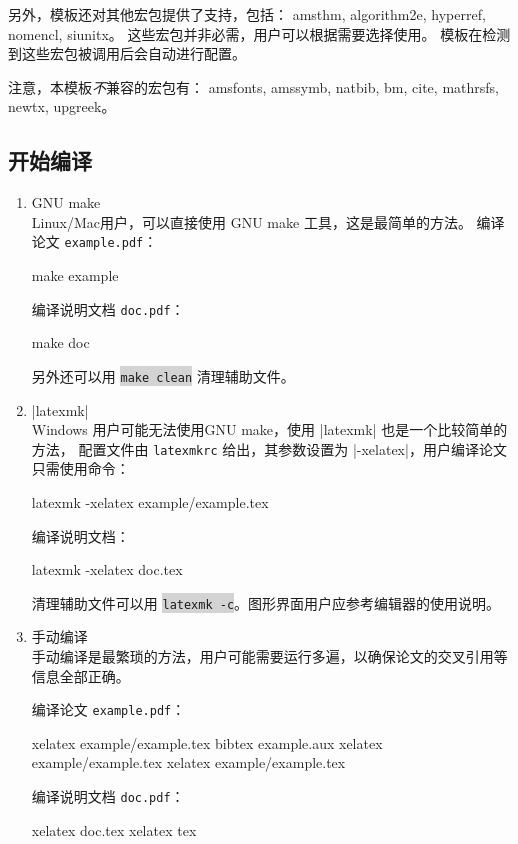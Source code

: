 \documentclass[a4paper]{ltxdoc}
\DeclareRobustCommand\file{\nolinkurl}
\DeclareRobustCommand\pkg{\textsf}
\newcommand\shellcmd[1]{\colorbox{lightgray}{\lstinline[style=lstshell]|#1|}}
\begin{document}
另外，模板还对其他宏包提供了支持，包括：
\pkg{amsthm},
\pkg{algorithm2e},
\pkg{hyperref},
\pkg{nomencl},
\pkg{siunitx}。
这些宏包并非必需，用户可以根据需要选择使用。
模板在检测到这些宏包被调用后会自动进行配置。

注意，本模板\emph{不}兼容的宏包有：
\pkg{amsfonts},
\pkg{amssymb},
\pkg{natbib},
\pkg{bm},
\pkg{cite},
\pkg{mathrsfs},
\pkg{newtx},
\pkg{upgreek}。


\subsection{开始编译}

\begin{enumerate}

\item GNU make \\
Linux/Mac用户，可以直接使用 GNU make 工具，这是最简单的方法。
编译论文 \file{example.pdf}：
\begin{shell}
  make example
\end{shell}
编译说明文档 \file{doc.pdf}：
\begin{shell}
  make doc
\end{shell}
另外还可以用 \shellcmd{make clean} 清理辅助文件。

\item |latexmk| \\
Windows 用户可能无法使用GNU make，使用 |latexmk| 也是一个比较简单的方法，
配置文件由 \file{latexmkrc} 给出，其参数设置为 |-xelatex|，用户编译论文
只需使用命令：
\begin{shell}
  latexmk -xelatex example/example.tex
\end{shell}
编译说明文档：
\begin{shell}
  latexmk -xelatex doc.tex
\end{shell}
清理辅助文件可以用 \shellcmd{latexmk -c}。图形界面用户应参考编辑器的使用说明。

\item 手动编译 \\
手动编译是最繁琐的方法，用户可能需要运行多遍，以确保论文的交叉引用等信息全部正确。

编译论文 \file{example.pdf}：
\begin{shell}
  xelatex example/example.tex
  bibtex example.aux
  xelatex example/example.tex
  xelatex example/example.tex
\end{shell}
编译说明文档 \file{doc.pdf}：
\begin{shell}
  xelatex doc.tex
  xelatex tex
\end{shell}
\end{enumerate}
\end{document}
